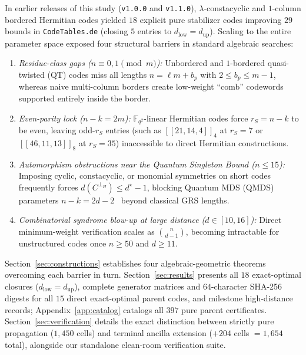 \documentclass[11pt,a4paper]{article}
\theoremstyle{remark}
\begin{document}
In earlier releases of this study (\texttt{v1.0.0} and \texttt{v1.1.0}), $\lambda$-constacyclic and $1$-column bordered Hermitian codes yielded $18$ explicit pure stabilizer codes improving $29$ bounds in \texttt{CodeTables.de} (closing $5$ entries to $d_{\mathrm{low}} = d_{\mathrm{up}}$). Scaling to the entire parameter space exposed four structural barriers in standard algebraic searches:
\begin{enumerate}
  \item \emph{Residue-class gaps ($n \equiv 0, 1 \pmod m$):} Unbordered and $1$-bordered quasi-twisted (QT) codes miss all lengths $n = \ell m + b_p$ with $2 \le b_p \le m - 1$, whereas naive multi-column borders create low-weight ``comb'' codewords supported entirely inside the border.
  \item \emph{Even-parity lock ($n - k = 2m$):} $\mathbb{F}_{q^2}$-linear Hermitian codes force $r_S = n - k$ to be even, leaving odd-$r_S$ entries (such as $[[21,14,4]]_4$ at $r_S = 7$ or $[[46,11,13]]_8$ at $r_S = 35$) inaccessible to direct Hermitian constructions.
  \item \emph{Automorphism obstructions near the Quantum Singleton Bound ($n \le 15$):} Imposing cyclic, constacyclic, or monomial symmetries on short codes frequently forces $d(C^{\perp_H}) \le d^\star - 1$, blocking Quantum MDS (QMDS) parameters $n - k = 2d - 2$~\cite{Rains1999,Ball2021} beyond classical GRS lengths.
  \item \emph{Combinatorial syndrome blow-up at large distance ($d \in [10, 16]$):} Direct minimum-weight verification scales as $\binom{n}{d-1}$, becoming intractable for unstructured codes once $n \ge 50$ and $d \ge 11$.
\end{enumerate}

Section~\ref{sec:constructions} establishes four algebraic-geometric theorems overcoming each barrier in turn. Section~\ref{sec:results} presents all $18$ exact-optimal closures ($d_{\mathrm{low}} = d_{\mathrm{up}}$), complete generator matrices and $64$-character SHA-256 digests for all $15$ direct exact-optimal parent codes, and milestone high-distance records; Appendix~\ref{app:catalog} catalogs all $397$ pure parent certificates. Section~\ref{sec:verification} details the exact distinction between strictly pure propagation ($1{,}450$ cells) and terminal ancilla extension ($+204$ cells $= 1{,}654$ total), alongside our standalone clean-room verification suite.
\end{document}
